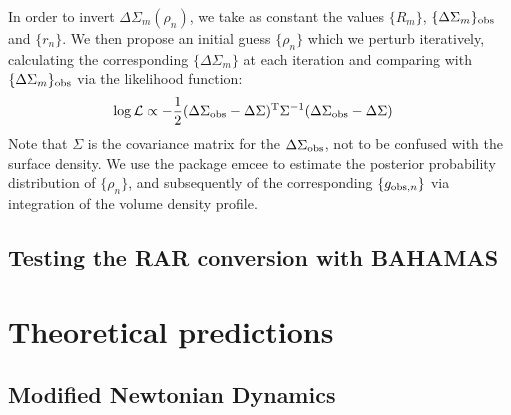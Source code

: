 \documentclass[usenatbib]{mnras}
\begin{document}
In order to invert $\Delta\Sigma_m(\rho_n)$, we take as constant the values $\{R_m\}$, $\{\Delta\Sigma_m\}_{\rm obs}$ and $\{r_n\}$. We then propose an initial guess $\{\rho_n\}$ which we perturb iteratively, calculating the corresponding $\{\Delta\Sigma_m\}$ at each iteration and comparing with $\{\Delta\Sigma_m\}_{\rm obs}$ via the likelihood function:
\begin{align}
\log\mathcal{L} &\propto -\frac{1}{2}(\Delta\Sigma_{\rm obs}-\Delta\Sigma)^{\rm T}\Sigma^{-1}(\Delta\Sigma_{\rm obs}-\Delta\Sigma)
\end{align}
Note that $\Sigma$ is the covariance matrix for the $\Delta\Sigma_{\rm obs}$, not to be confused with the surface density. We use the package {\sc emcee} \citep{foreman-mackey13} to estimate the posterior probability distribution of $\{\rho_n\}$, and subsequently of the corresponding $\{g_{{\rm obs},n}\}$ via integration of the volume density profile.


\subsection{Testing the RAR conversion with BAHAMAS}
\label{sec:conversion_test}

\section{Theoretical predictions}
\label{sec:theories}

\subsection{Modified Newtonian Dynamics}
\label{sec:MOND}
\end{document}
